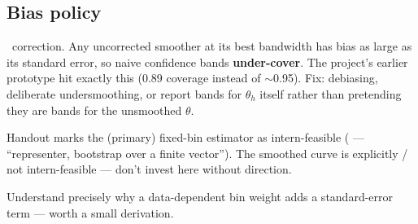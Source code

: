 \subsection{Bias policy}

\newtag~correction. Any uncorrected smoother at its best bandwidth has bias
as large as its standard error, so naive confidence bands
\textbf{under-cover}. The project's earlier prototype hit exactly this
(0.89 coverage instead of $\sim$0.95). Fix: debiasing, deliberate
undersmoothing, or report bands for $\theta_h$ itself rather than pretending
they are bands for the unsmoothed $\theta$.

\begin{openquestions}
  \item Handout marks the (primary) fixed-bin estimator as intern-feasible
    (\feasmod{} --- ``representer, bootstrap over a finite vector''). The
    smoothed curve is explicitly \feasno{} / not intern-feasible --- don't
    invest here without direction.
  \item Understand precisely why a data-dependent bin weight adds a
    standard-error term --- worth a small derivation.
\end{openquestions}
